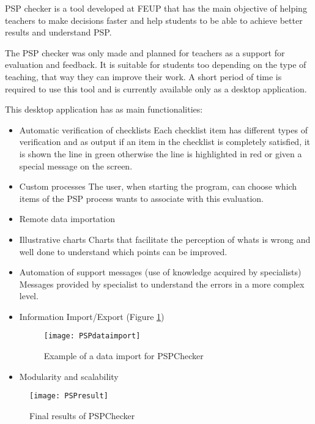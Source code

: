 PSP checker\citep{Pinto2010} is a tool developed at FEUP that has the main objective of helping teachers to make decisions faster and help students to be able to achieve better results and understand PSP.

The PSP checker was only made and planned for teachers as a support for evaluation and feedback. It is suitable for students too depending on the type of teaching, that way they can improve their work. A short period of time is required to use this tool and is currently available only as a desktop application.


This desktop application has as main functionalities:
\begin{itemize}
	\item Automatic verification of checklists
	\subitem Each checklist item has different types of verification and as output if an item in the checklist is completely satisfied, it is shown the line in green otherwise the line is highlighted in red or given a special message on the screen.
	\item Custom processes
	\subitem The user, when starting the program, can choose which items of the PSP process wants to associate with this evaluation.
	\item Remote data importation
	\item Illustrative charts
	\subitem Charts that facilitate the perception of whats is wrong and well done to understand which points can be improved.
	\item Automation of support messages (use of knowledge acquired by specialists)
	\subitem Messages provided by specialist to understand the errors in a more complex level.
	\item Information Import/Export (Figure \ref{fig:PSPdataimport})
	\begin{figure}[h]
		\begin{center}
			\leavevmode
			\texttt{[image: PSPdataimport]}
			\caption{Example of a data import for PSPChecker}
			\label{fig:PSPdataimport}
		\end{center}
	\end{figure}
	\item Modularity and scalability
\end{itemize}

\begin{figure}[h]
	\begin{center}
		\leavevmode
		\texttt{[image: PSPresult]}
		\caption{Final results of PSPChecker}
		\label{fig:PSPresults}
	\end{center}
\end{figure}

